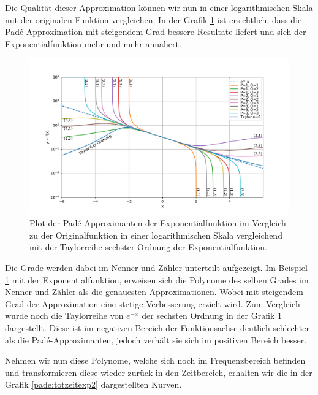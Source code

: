 Die Qualität dieser Approximation können wir nun in einer logarithmischen Skala mit der originalen Funktion vergleichen.
In der Grafik \ref{pade:totzeitexp} ist ersichtlich, dass die Padé-Approximation mit steigendem Grad bessere Resultate liefert und sich der Exponentialfunktion mehr und mehr annähert.

\begin{figure}[!h]
	\centering
	\includegraphics[width=1\linewidth]{./papers/pade/python/bilder/totzeit.pdf}
	\caption{Plot der Padé-Approximanten der Exponentialfunktion im Vergleich zu der Originalfunktion in einer logarithmischen Skala vergleichend mit der Taylorreihe sechster Ordnung der Exponentialfunktion.\label{pade:totzeitexp}}
\end{figure}

Die Grade werden dabei im Nenner und Zähler unterteilt aufgezeigt.
Im Beispiel \ref{pade:totzeitexp} mit der Exponentialfunktion, erweisen sich die Polynome des selben Grades im Nenner und Zähler als die genauesten Approximationen.
Wobei mit steigendem Grad der Approximation eine stetige Verbesserung erzielt wird.
Zum Vergleich wurde noch die Taylorreihe von $e^{-x}$ der sechsten Ordnung in der Grafik \ref{pade:totzeitexp} dargestellt. 
Diese ist im negativen Bereich der Funktionsachse deutlich schlechter als die Padé-Approximanten, jedoch verhält sie sich im positiven Bereich besser.


Nehmen wir nun diese Polynome, welche sich noch im Frequenzbereich befinden und transformieren diese wieder zurück in den Zeitbereich, erhalten wir die in der Grafik \ref{pade:totzeitexp2} dargestellten Kurven.

